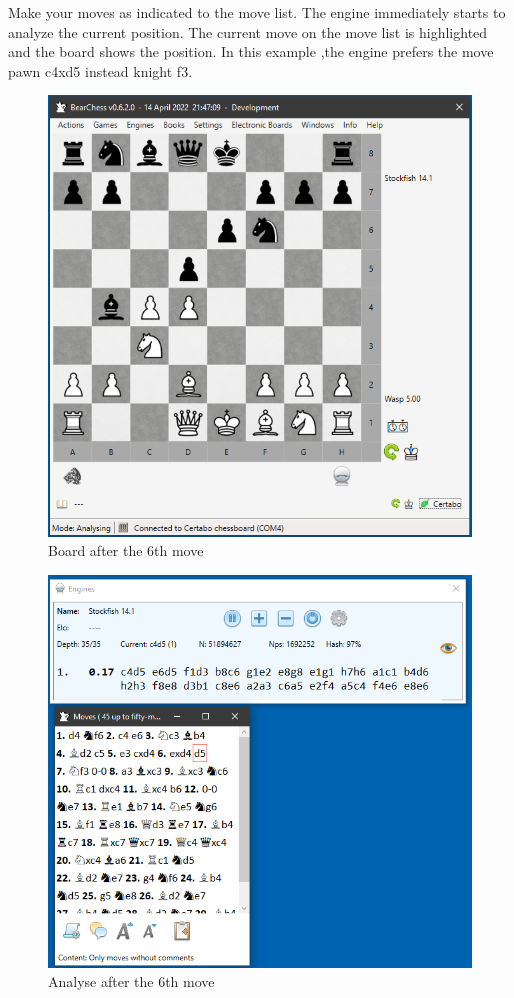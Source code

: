 \documentclass[11pt,a4paper]{article}
\begin{document}
Make your moves as indicated to the move list. The engine immediately starts to analyze the current position. The current move on the move list is highlighted  and the board shows the position. In this example ,the engine prefers the move pawn c4xd5 instead knight f3.


\begin{figure}[H]
	\centering
	\includegraphics[scale=0.7]{AnalyzeMode6.png}
	\caption{Board after the 6th move}
	\label{fig:AnalyzeMode6}
\end{figure}


\begin{figure}[H]
	\centering
	\includegraphics[scale=0.7]{AnalyzeMode5.png}
	\caption{Analyse after the 6th move}
	\label{fig:AnalyzeMode5}
\end{figure}
\end{document}
